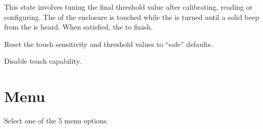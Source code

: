 \pagebreak
{} \par\medskip

This state involves tuning the final threshold value after calibrating, reading
or configuring.  The  of the enclosure is touched while the  is
turned until a solid beep from the  is heard.  When satisfied, 
the  to finish.


 \par\medskip

Reset the touch sensitivity and threshold values to ``safe'' defaults.


 \par\medskip

Disable touch capability.


\section{Menu}  \label{Touch - Menu}

Select one of the \num{5} menu options.

